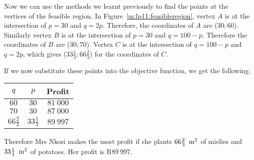 Now we can use the methods we learnt previously to find the points at the vertices of the feasible region. In Figure~\ref{m:lp11:feasibleregion}, vertex $A$ is at the intersection of $p=30$ and $q=2p$. Therefore, the coordinates of $A$ are ($30;60$). Similarly vertex $B$ is at the intersection of $p=30$ and $q=100-p$. Therefore the coordinates of $B$ are ($30;70$). Vertex $C$ is at the intersection of $q=100-p$ and $q=2p$, which gives ($33\frac{1}{3};66\frac{2}{3}$) for the coordinates of $C$.

If we now substitute these points into the objective function, we get the following:
\begin{center}
\begin{tabular}{|c|c|c|}\hline
$q$&$p$&Profit\\\hline\hline
$60$&$30$&$81~000$\\\hline
$70$&$30$&$87~000$\\\hline
$66\frac{2}{3}$&$33\frac{1}{3}$&$89~997$\\\hline
\hline
\end{tabular}
\end{center}

Therefore Mrs Nkosi makes the most profit if she plants $66\frac{2}{3}~\,\rm{m}^2$ of mielies and $33\frac{1}{3}~\,\rm{m}^2$ of potatoes. Her profit is R$89~997$.

